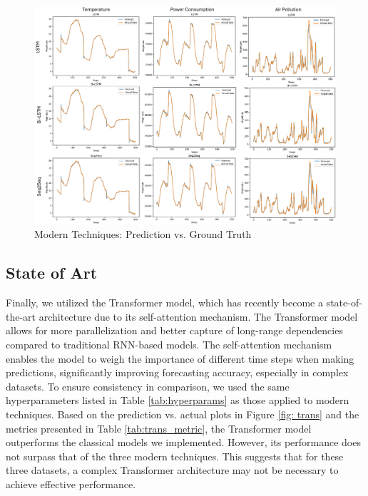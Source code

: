 \documentclass{scrartcl}
\begin{document}
\begin{figure}[H]
	\begin{center}
		\includegraphics[scale=0.8]{Latex_report/fig/modern.pdf}
	\end{center}
	\caption{Modern Techniques: Prediction vs. Ground Truth}
	\label{fig:modern}
\end{figure}



\subsection{State of Art}
Finally, we utilized the Transformer model, which has recently become a state-of-the-art architecture due to its self-attention mechanism. The Transformer model allows for more parallelization and better capture of long-range dependencies compared to traditional RNN-based models. The self-attention mechanism enables the model to weigh the importance of different time steps when making predictions, significantly improving forecasting accuracy, especially in complex datasets. 
To ensure consistency in comparison, we used the same hyperparameters listed in Table \ref{tab:hyperparams} as those applied to modern techniques. Based on the prediction vs. actual plots in Figure \ref{fig: trans} and the metrics presented in Table \ref{tab:trans_metric}, the Transformer model outperforms the classical models we implemented. However, its performance does not surpass that of the three modern techniques. This suggests that for these three datasets, a complex Transformer architecture may not be necessary to achieve effective performance.
\end{document}
